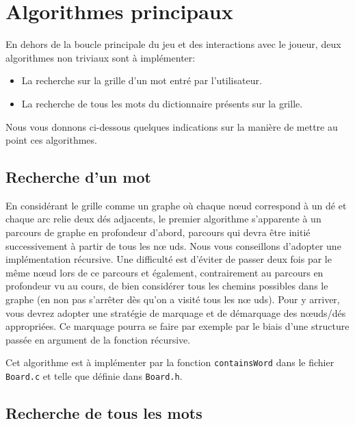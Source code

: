 \documentclass[a4paper,10pt]{article}
\begin{document}
\section{Algorithmes principaux}

En dehors de la boucle principale du jeu et des interactions avec
le joueur, deux algorithmes non triviaux sont à implémenter:

\begin{itemize}
\item La recherche sur la grille d'un mot entré par l'utilisateur.
\item La recherche de tous les mots du dictionnaire présents sur la
  grille.
\end{itemize}

Nous vous donnons ci-dessous quelques indications sur la manière de
mettre au point ces algorithmes.

\subsection{Recherche d'un mot}

En considérant le grille comme un graphe où chaque n\oe ud correspond
à un dé et chaque arc relie deux dés adjacents, le premier algorithme
s'apparente à un parcours de graphe en profondeur d'abord, parcours
qui devra être initié successivement à partir de tous les n\oe
uds. Nous vous conseillons d'adopter une implémentation récursive. Une
difficulté est d'éviter de passer deux fois par le même n\oe ud lors
de ce parcours et également, contrairement au parcours en profondeur
vu au cours, de bien considérer tous les chemins possibles dans le
graphe (en non pas s'arrêter dès qu'on a visité tous les n\oe
uds). Pour y arriver, vous devrez adopter une stratégie de marquage et
de démarquage des n\oe uds/dés appropriées. Ce marquage pourra se
faire par exemple par le biais d'une structure passée en argument de
la fonction récursive.

Cet algorithme est à implémenter par la fonction \texttt{containsWord}
dans le fichier \texttt{Board.c} et telle que définie dans \texttt{Board.h}.

\subsection{Recherche de tous les mots}
\end{document}
